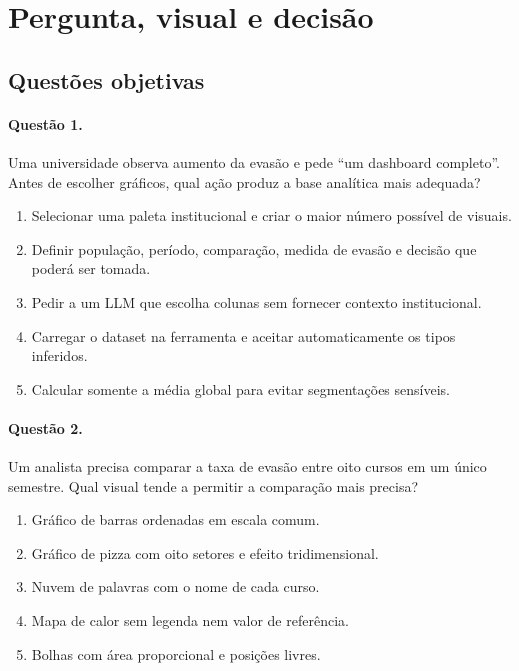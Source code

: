 \section{Pergunta, visual e decisão}

\subsection*{Questões objetivas}

\paragraph{Questão 1.} Uma universidade observa aumento da evasão e pede ``um dashboard completo''. Antes de escolher gráficos, qual ação produz a base analítica mais adequada?

\begin{enumerate}[label=\Alph*)]
\item Selecionar uma paleta institucional e criar o maior número possível de visuais.
\item Definir população, período, comparação, medida de evasão e decisão que poderá ser tomada.
\item Pedir a um LLM que escolha colunas sem fornecer contexto institucional.
\item Carregar o dataset na ferramenta e aceitar automaticamente os tipos inferidos.
\item Calcular somente a média global para evitar segmentações sensíveis.
\end{enumerate}

\paragraph{Questão 2.} Um analista precisa comparar a taxa de evasão entre oito cursos em um único semestre. Qual visual tende a permitir a comparação mais precisa?

\begin{enumerate}[label=\Alph*)]
\item Gráfico de barras ordenadas em escala comum.
\item Gráfico de pizza com oito setores e efeito tridimensional.
\item Nuvem de palavras com o nome de cada curso.
\item Mapa de calor sem legenda nem valor de referência.
\item Bolhas com área proporcional e posições livres.
\end{enumerate}

